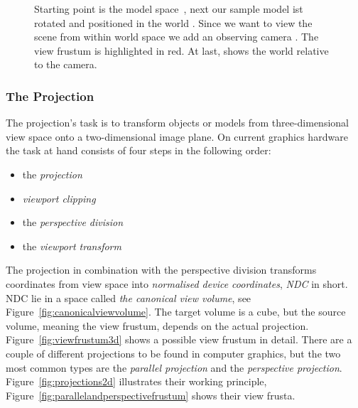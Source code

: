 \begin{figure}[t]
{  \label{fig:subfigviewspace}
}
\caption[Model, World and View space]{Starting point is the model
space~, next our sample model ist rotated and
positioned in the world . Since we want to view the
scene from within world space we add an observing camera
. The view frustum is highlighted in
red. At last,  shows the world relative to the
camera.}
\label{fig:ModelWorldView}
\end{figure}

\subsubsection{The Projection}

The projection's task is to transform objects or models from three-dimensional
view space onto a two-dimensional image plane. On current graphics hardware the
task at hand consists of four steps in the following order:
\begin{itemize}
 \item the \textit{projection}
 \item \textit{viewport clipping}
 \item the \textit{perspective division}
 \item the \textit{viewport transform}
\end{itemize}

The projection in combination with the perspective division transforms
coordinates from view space into \textit{normalised device coordinates},
\textit{NDC} in short. NDC lie in a space called \textit{the canonical view
volume}, see Figure~\ref{fig:canonicalviewvolume}. The target volume is a cube,
but the source volume, meaning the view frustum, depends on the actual
projection. Figure~\ref{fig:viewfrustum3d} shows a possible view frustum in
detail. There are a couple of different projections to be found in computer
graphics, but the two most common types are the \textit{parallel projection} and
the \textit{perspective projection}. Figure~\ref{fig:projections2d} illustrates
their working principle, Figure~\ref{fig:parallelandperspectivefrustum} shows
their view frusta.

